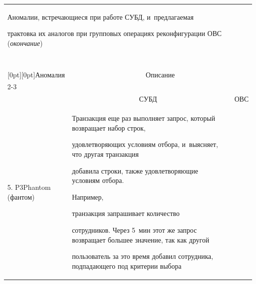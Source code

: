  \renewcommand{\baselinestretch}{0.87}





\begin{table}\small


\begin{center}


\label{aa}


\tabcolsep=3pt




\begin{tabular}{|p{51.7pt}|p{131pt}|p{170.4pt}|}


\multicolumn{3}{p{126mm}}{Аномалии, встречающиеся при работе СУБД, и~предлагаемая 


трактовка их аналогов при групповых операциях реконфигурации ОВС (\textit{окончание})}\\


\multicolumn{3}{c}{\ }\\[-6pt]


\hline %


\multicolumn{1}{|c|}{\raisebox{-6pt}[0pt][0pt]{Аномалия}} &\multicolumn{2}{c|}{Описание}\\


\cline{2-3}


&&\\[-9pt]


&\multicolumn{1}{c|}{СУБД~\cite{10-g3}}&


\multicolumn{1}{c|}{ОВС}\\


\hline


5. P3\newline Phantom (фантом)&


Транзакция еще раз выполняет запрос, который возвращает набор строк, 


удовле\-тво\-ря\-ющих условиям отбора, и~выясняет, что другая транзакция 


добавила строки, также удовлетворяющие условиям отбора. 





На\-при\-мер, 


транзакция запрашивает количество 


сотрудников. Через 5~мин этот же запрос возвращает большее значение, так как другой 


пользователь за это время добавил сотрудника, под\-па\-да\-юще\-го под критерии выбора 



\end{tabular}
\end{center}
\end{table}
